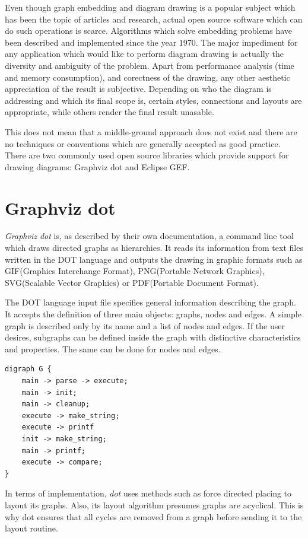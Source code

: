 Even though graph embedding and diagram drawing is a popular subject which has been the topic of articles and research, 
actual open source software which can do such operations is scarce. Algorithms which solve embedding problems have been 
described and implemented since the year 1970. The major impediment for any application which would like to perform 
diagram drawing is actually the diversity and ambiguity of the problem. Apart from performance analysis (time and 
memory consumption), and corectness of the drawing, any other aesthetic appreciation of the result is subjective.
Depending on who the diagram is addressing and which its final scope is, certain styles, connections and layouts are 
appropriate, while others render the final result unasable.

This does not mean that a middle-ground approach does not exist and there are no techniques or conventions which are 
generally accepted as good practice. There are two commonly used open source libraries which provide support for 
drawing diagrams: Graphviz dot and Eclipse GEF.

\section{Graphviz dot}

\emph{Graphviz dot} is, as described by their own documentation, a command line tool which draws directed graphs as 
hierarchies. It reads its information from text files written in the DOT language and outputs the drawing in 
graphic formats such as GIF(Graphics Interchange Format), PNG(Portable Network Graphics), SVG(Scalable Vector 
Graphics) or PDF(Portable Document Format).

The DOT language input file specifies general information describing the graph. It accepts the definition of three 
main objects: graphs, nodes and edges. A simple graph is described only by its name and a list of nodes and edges.
If the user desires, subgraphs can be defined inside the graph with distinctive characteristics and properties. 
The same can be done for nodes and edges.

\begin{lstlisting}[caption={Simple dot file format}]
digraph G {
	main -> parse -> execute;
	main -> init;
	main -> cleanup;
	execute -> make_string;
	execute -> printf
	init -> make_string;
	main -> printf;
	execute -> compare;
}
\end{lstlisting}

In terms of implementation, \emph{dot} uses methods such as force directed placing to layout its graphs. Also, its 
layout algorithm presumes graphs are acyclical. This is why dot ensures that all cycles are removed from a graph 
before sending it to the layout routine. 

